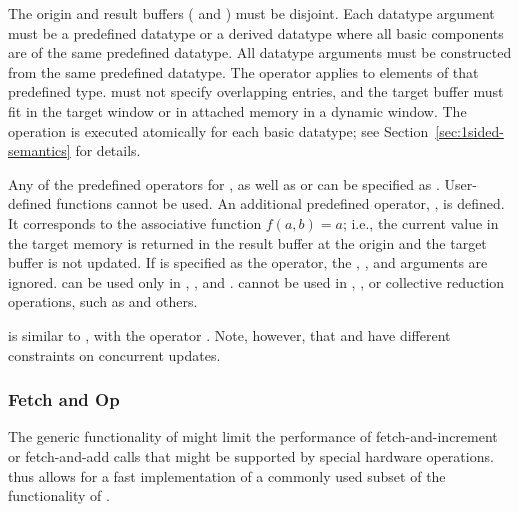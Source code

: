 The origin and result buffers ( and
) must be disjoint. 
Each datatype argument must be a predefined datatype or a derived
datatype where all basic components are of the same predefined
datatype.  All datatype arguments must be constructed from the same
predefined datatype.
The operator  applies to elements of that predefined
type.  must not specify overlapping 
entries, and the target buffer must fit in the target window or in
attached memory in a dynamic window.
%
The operation is executed atomically for each basic datatype; see
Section~\ref{sec:1sided-semantics} for details.

Any of the predefined operators for ,
as well as
 or  can be specified as
.  User-defined functions cannot be used. 
%
An additional predefined operator, , is defined.
It corresponds to the associative function $f(a,b) = a$; i.e., the current
value in the target memory is returned in the result buffer at the
origin and the target buffer is not updated.
%
If  is specified as the operator, the
,
, and  arguments are ignored.
 can be used only in ,
, and .
 cannot be used
in , , or collective
reduction operations, such as  and others.

\begin{users}
 is similar to 
,
with the  operator .
Note, however, that  and
have different constraints on concurrent updates.
\end{users}

\subsubsection{Fetch and Op}
\label{sec:1sided-fetchandop}

The generic functionality of  might
limit the performance of fetch-and-increment or fetch-and-add
calls that might be supported by special hardware operations.
 thus allows for a fast implementation of
a commonly used subset of the functionality of
.

